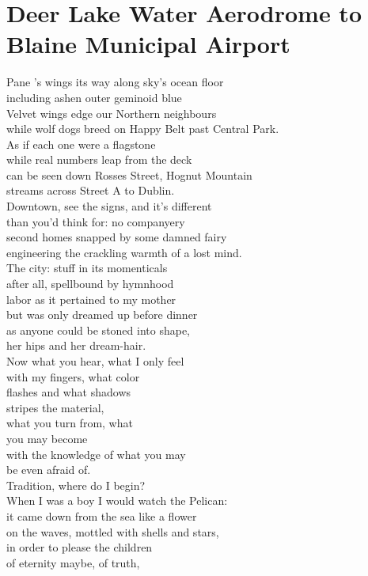 \documentclass[smalldemyvopaper,11pt,twoside,onecolumn,openright,extrafontsizes]{memoir}
\begin{document}
\chapter{Deer Lake Water Aerodrome to Blaine Municipal Airport}
Pane 's wings its way along sky's ocean floor
\\including ashen outer geminoid blue
\\Velvet wings edge our Northern neighbours
\\while wolf dogs breed on Happy Belt past Central Park.
\\As if each one were a flagstone
\\while real numbers leap from the deck
\\can be seen down Rosses Street, Hognut Mountain
\\streams across Street A to Dublin.
\\Downtown, see the signs, and it's different
\\than you'd think for: no companyery
\\second homes snapped by some damned fairy
\\engineering the crackling warmth of a lost mind.
\\The city: stuff in its momenticals
\\after all, spellbound by hymnhood
\\labor as it pertained to my mother
\\but was only dreamed up before dinner
\\as anyone could be stoned into shape,
\\her hips and her dream-hair.
\\Now what you hear, what I only feel
\\with my fingers, what color
\\flashes and what shadows
\\stripes the material,
\\what you turn from, what
\\you may become
\\with the knowledge of what you may
\\be even afraid of.
\\Tradition, where do I begin?
\\When I was a boy I would watch the Pelican:
\\it came down from the sea like a flower
\\on the waves, mottled with shells and stars,
\\in order to please the children
\\of eternity maybe, of truth,
\end{document}
